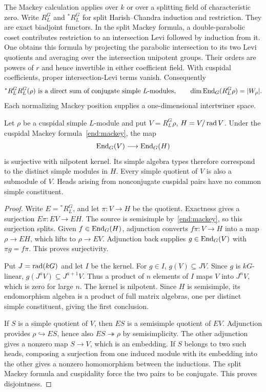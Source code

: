 The Mackey calculation applies over $k$ or over a splitting field
of characteristic zero.
Write $R_L^G$ and ${}^*R_L^G$ for
split Harish--Chandra induction and restriction.  They are exact
biadjoint functors.  In the split Mackey formula, a double-parabolic
coset contributes restriction to an intersection Levi followed by
induction from it.  One obtains this formula by projecting the
parabolic intersection to its two Levi quotients and averaging
over the intersection unipotent groups.  Their orders are powers
of $r$ and hence invertible in either coefficient field.  With
cuspidal coefficients, proper intersection-Levi terms vanish.
Consequently
\begin{equation}\label{end:mackey}
 {}^*R_L^G R_L^G(\rho)
   \text{ is a direct sum of conjugate simple $L$-modules},
 \qquad
 \dim\operatorname{End}_G(R_L^G\rho)=|W_\rho|.
\end{equation}
Each normalizing Mackey position supplies a one-dimensional
intertwiner space.

\begin{lemma}\label{end:head}
Let $\rho$ be a cuspidal simple $L$-module and put
$V=R_L^G\rho$, $H=V/\operatorname{rad} V$.  Under the cuspidal Mackey
formula~\eqref{end:mackey}, the map
\[
 \operatorname{End}_G(V)\longrightarrow\operatorname{End}_G(H)
\]
is surjective with nilpotent kernel.  Its simple algebra
types therefore correspond to the distinct simple modules
in $H$.  Every simple quotient of $V$ is also a submodule
of $V$.  Heads arising from nonconjugate cuspidal pairs
have no common simple constituent.
\end{lemma}

\begin{proof}
Write $E={}^*R_L^G$, and let $\pi:V\to H$ be the quotient.
Exactness gives a surjection $E\pi:EV\to EH$.  The source
is semisimple by~\eqref{end:mackey}, so this surjection
splits.  Given $f\in\operatorname{End}_G(H)$, adjunction converts
$f\pi:V\to H$ into a map $\rho\to EH$, which lifts to
$\rho\to EV$.  Adjunction back supplies $g\in\operatorname{End}_G(V)$
with $\pi g=f\pi$.  This proves surjectivity.

Put $J=\operatorname{rad}(kG)$ and let $I$ be the kernel.  For $g\in I$,
$g(V)\subseteq JV$.  Since $g$ is $kG$-linear,
$g(J^aV)\subseteq J^{a+1}V$.  Thus a product of $n$
elements of $I$ maps $V$ into $J^nV$, which is zero for
large $n$.  The kernel is nilpotent.  Since $H$ is
semisimple, its endomorphism algebra is a product of full
matrix algebras, one per distinct simple constituent,
giving the first conclusion.

If $S$ is a simple quotient of $V$, then $ES$ is a
semisimple quotient of $EV$.  Adjunction provides
$\rho\hookrightarrow ES$, hence also $ES\twoheadrightarrow
\rho$ by semisimplicity.  The other adjunction gives a
nonzero map $S\to V$, which is an embedding.  If $S$
belongs to two such heads, composing a surjection from
one induced module with its embedding into the other
gives a nonzero homomorphism between the inductions.
The split Mackey formula and cuspidality force the two
pairs to be conjugate.  This proves disjointness.
\end{proof}


